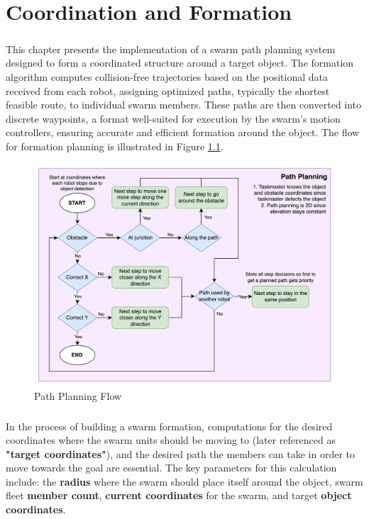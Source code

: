 \chapter{Coordination and Formation}

\paragraph*{}
This chapter presents the implementation of a swarm path planning system designed to form a coordinated structure around a target object. The formation algorithm computes collision-free trajectories based on the positional data received from each robot, assigning optimized paths, typically the shortest feasible route, to individual swarm members. These paths are then converted into discrete waypoints, a format well-suited for execution by the swarm’s motion controllers, ensuring accurate and efficient formation around the object. The flow for formation planning is illustrated in Figure \ref{fig:path-planning-flow}.

\begin{figure} [H]
    \centering
    \includegraphics[width=1\linewidth]{assets/images/formation/path-planning-flow.png}
    \caption{Path Planning Flow}
    \label{fig:path-planning-flow}
\end{figure}

\paragraph*{}
In the process of building a swarm formation, computations for the desired coordinates where the swarm units should be moving to (later referenced as \textbf{"target coordinates"}), and the desired path the members can take in order to move towards the goal are essential. The key parameters for this calculation include: the \textbf{radius} where the swarm should place itself around the object, swarm fleet \textbf{member count}, \textbf{current coordinates} for the swarm, and target \textbf{object coordinates}.

